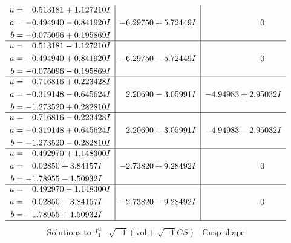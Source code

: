 \documentclass[1p]{elsarticle_modified}
\theoremstyle{definition}
\newcommand{\I}{\sqrt{-1}}
\begin{document}
$$\begin{array}{c|c|c}
\begin{aligned}
u &= \phantom{-}0.513181 + 1.127210 I \\
a &= -0.494940 - 0.841920 I \\
b &= -0.075096 + 0.195869 I\end{aligned}
 & -6.29750 + 5.72449 I & \phantom{-0.000000 } 0 \\ \hline\begin{aligned}
u &= \phantom{-}0.513181 - 1.127210 I \\
a &= -0.494940 + 0.841920 I \\
b &= -0.075096 - 0.195869 I\end{aligned}
 & -6.29750 - 5.72449 I & \phantom{-0.000000 } 0 \\ \hline\begin{aligned}
u &= \phantom{-}0.716816 + 0.223428 I \\
a &= -0.319148 - 0.645624 I \\
b &= -1.273520 + 0.282810 I\end{aligned}
 & \phantom{-}2.20690 - 3.05991 I & -4.94983 + 2.95032 I \\ \hline\begin{aligned}
u &= \phantom{-}0.716816 - 0.223428 I \\
a &= -0.319148 + 0.645624 I \\
b &= -1.273520 - 0.282810 I\end{aligned}
 & \phantom{-}2.20690 + 3.05991 I & -4.94983 - 2.95032 I \\ \hline\begin{aligned}
u &= \phantom{-}0.492970 + 1.148300 I \\
a &= \phantom{-}0.02850 + 3.84157 I \\
b &= -1.78955 - 1.50932 I\end{aligned}
 & -2.73820 + 9.28492 I & \phantom{-0.000000 } 0 \\ \hline\begin{aligned}
u &= \phantom{-}0.492970 - 1.148300 I \\
a &= \phantom{-}0.02850 - 3.84157 I \\
b &= -1.78955 + 1.50932 I\end{aligned}
 & -2.73820 - 9.28492 I & \phantom{-0.000000 } 0\\
 \hline 
 \end{array}$$\newpage$$\begin{array}{c|c|c}  
\text{Solutions to }I^u_{1}& \I (\text{vol} + \sqrt{-1}CS) & \text{Cusp shape}\\
 \hline 
\begin{aligned}

\end{aligned}
\end{array}$$
\end{document}
